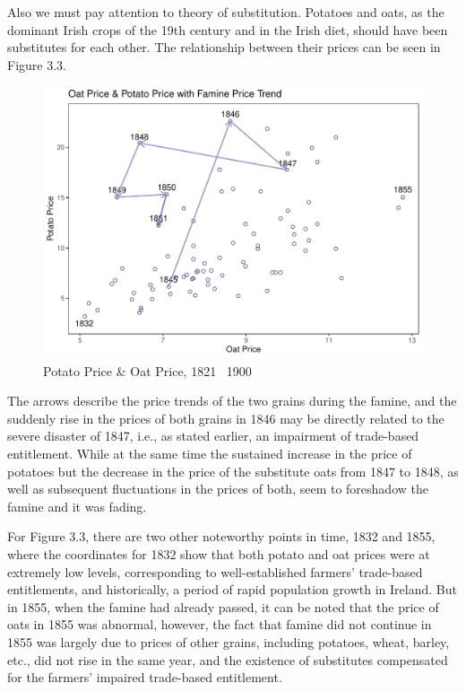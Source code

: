 Also we must pay attention to theory of substitution. Potatoes and oats, as the dominant Irish crops of the 19th century and in the Irish diet, should have been substitutes for each other. The relationship between their prices can be seen in Figure 3.3.

\begin{figure}[h]
    \centering
    \caption{Potato Price \& Oat Price, 1821 \textendash\ 1900}
    \includegraphics[width=.95\textwidth]{../03_outputs/grain_substituion.pdf}
\end{figure}

The arrows describe the price trends of the two grains during the famine, and the suddenly rise in the prices of both grains in 1846 may be directly related to the severe disaster of 1847, i.e., as stated earlier, an impairment of trade-based entitlement. While at the same time the sustained increase in the price of potatoes but the decrease in the price of the substitute oats from 1847 to 1848, as well as subsequent fluctuations in the prices of both, seem to foreshadow the famine and it was fading.

For Figure 3.3, there are two other noteworthy points in time, 1832 and 1855, where the coordinates for 1832 show that both potato and oat prices were at extremely low levels, corresponding to well-established farmers' trade-based entitlements, and historically, a period of rapid population growth in Ireland. But in 1855, when the famine had already passed, it can be noted that the price of oats in 1855 was abnormal, however, the fact that famine did not continue in 1855 was largely due to prices of other grains, including potatoes, wheat, barley, etc., did not rise in the same year, and the existence of substitutes compensated for the farmers' impaired trade-based entitlement.

